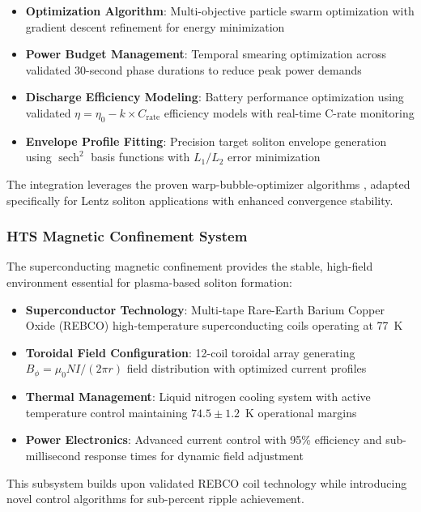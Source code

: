 \documentclass[12pt,a4paper]{article}
\newcommand{\sech}{\operatorname{sech}}
\begin{document}
\begin{itemize}
\item \textbf{Optimization Algorithm}: Multi-objective particle swarm optimization with gradient descent refinement for energy minimization
\item \textbf{Power Budget Management}: Temporal smearing optimization across validated 30-second phase durations to reduce peak power demands
\item \textbf{Discharge Efficiency Modeling}: Battery performance optimization using validated $\eta = \eta_0 - k \times C_{\text{rate}}$ efficiency models with real-time C-rate monitoring
\item \textbf{Envelope Profile Fitting}: Precision target soliton envelope generation using $\sech^2$ basis functions with $L_1/L_2$ error minimization
\end{itemize}

The integration leverages the proven warp-bubble-optimizer algorithms \cite{WarpBubble2024}, adapted specifically for Lentz soliton applications with enhanced convergence stability.

\subsubsection{HTS Magnetic Confinement System}

The superconducting magnetic confinement provides the stable, high-field environment essential for plasma-based soliton formation:

\begin{itemize}
\item \textbf{Superconductor Technology}: Multi-tape Rare-Earth Barium Copper Oxide (REBCO) high-temperature superconducting coils operating at 77~K
\item \textbf{Toroidal Field Configuration}: 12-coil toroidal array generating $B_\phi = \mu_0 NI/(2\pi r)$ field distribution with optimized current profiles
\item \textbf{Thermal Management}: Liquid nitrogen cooling system with active temperature control maintaining $74.5 \pm 1.2$~K operational margins
\item \textbf{Power Electronics}: Advanced current control with 95\% efficiency and sub-millisecond response times for dynamic field adjustment
\end{itemize}

This subsystem builds upon validated REBCO coil technology \cite{HTS2024} while introducing novel control algorithms for sub-percent ripple achievement.
\end{document}
